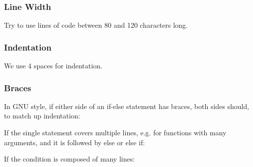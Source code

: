 \subsubsection*{Line Width}

Try to use lines of code between 80 and 120 characters long.

\subsubsection*{Indentation}

We use 4 spaces for indentation.

\subsubsection*{Braces}


\begin{DoxyEnumerate}
\item In G\+NU style, if either side of an if-\/else statement has braces, both sides should, to match up indentation\+: 
\begin{DoxyCode}{0}
\DoxyCodeLine{    \{}
\DoxyCodeLine{    \}}
\DoxyCodeLine{\textcolor{keywordflow}{else}:}
\DoxyCodeLine{    \{}
\DoxyCodeLine{    \}}
\end{DoxyCode}

\item If the single statement covers multiple lines, e.\+g. for functions with many arguments, and it is followed by else or else if\+: 
\begin{DoxyCode}{0}
\DoxyCodeLine{    \{}
\DoxyCodeLine{    \}}
\DoxyCodeLine{\textcolor{keywordflow}{else}:}
\DoxyCodeLine{    \{}
\DoxyCodeLine{    \}}
\end{DoxyCode}

\item If the condition is composed of many lines\+: 
\begin{DoxyCode}{0}
\DoxyCodeLine{    \{}
\DoxyCodeLine{    \}}
\end{DoxyCode}

\end{DoxyEnumerate}

